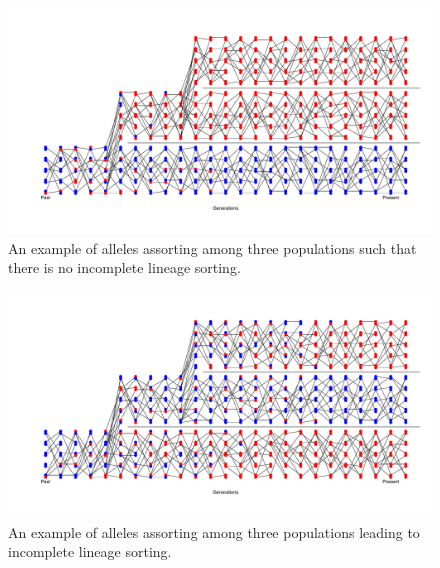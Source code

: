 \begin{figure}
\begin{center}
\includegraphics[width=\textwidth]{figures/Genetic_drift/ILS/no_ILS.pdf}
\end{center}
\caption{An example of alleles assorting among three populations such that there is no incomplete lineage sorting. } \label{fig:NoILS_poly} 
\end{figure}

\begin{figure}
\begin{center}
\includegraphics[width=\textwidth]{figures/Genetic_drift/ILS/ILS.pdf}
\end{center}
\caption{An example of alleles assorting among three populations leading to incomplete lineage sorting.  } \label{fig:ILS_poly} 
\end{figure}


